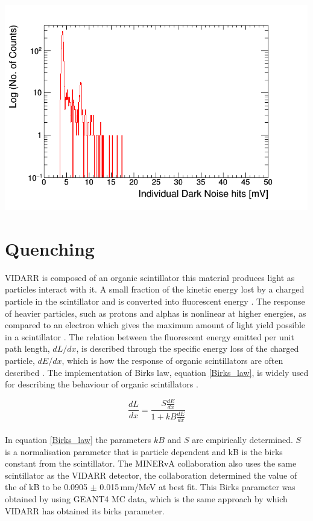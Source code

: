 \documentclass[12pt,a4paper]{article}
\newenvironment{Figure}
  {\par\medskip\noindent\minipage{\linewidth}}
  {\endminipage\par\medskip}
\begin{document}
\begin{Figure}
 \centering
 \includegraphics[height=90mm]{DarkNois_10E6_15kHz.png}
 \label{dark_noise_10E6_15Hz}
\end{Figure}


\section{Quenching}
VIDARR is composed of an organic scintillator this material produces light as particles interact with it. A small fraction of the kinetic energy lost by a charged particle in the scintillator and is converted into fluorescent energy \cite{rad_det_and_meas}. The response of heavier particles, such as protons and alphas is nonlinear at higher energies, as compared to an electron which gives the maximum amount of light yield possible in a scintillator \cite{rad_det_and_meas}. The relation between the fluorescent energy emitted per unit path length, $dL/dx$, is described through the specific energy loss of the charged particle, $dE/dx$, which is how the response of organic scintillators are often described \cite{rad_det_and_meas}. The implementation of Birks law, equation \ref{Birks_law}, is widely used for describing the behaviour of organic scintillators \cite{rad_det_and_meas} \cite{birks_book}.

\begin{equation}
\frac{dL}{dx} = \frac{S\frac{dE}{dx}}{1 + kB \frac{dE}{dx}}
\label{Birks_law}
\end{equation}
~\\
In equation \ref{Birks_law} the parameters $kB$ and $S$ are empirically determined. $S$ is a normalisation parameter that is particle dependent and kB is the birks constant from the scintillator. The MINERvA collaboration \cite{minerva_birks} also uses the same scintillator as the VIDARR detector, the collaboration determined the value of the of kB to be 0.0905 $\pm$ 0.015\,mm/MeV at best fit. This Birks parameter was obtained by using GEANT4 MC data, which is the same approach by which VIDARR has obtained its birks parameter.\\
\end{document}
